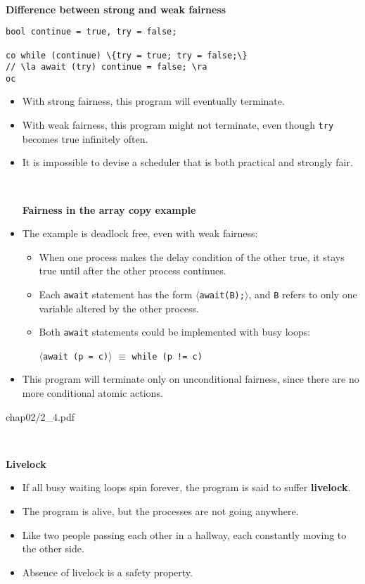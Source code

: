 \documentclass{article}
\newcommand{\myfigsmall}[1]{\begin{overpic}[scale=1.25]{#1}}
\newcommand{\myfigend}{\end{overpic}\newpage}
\newcommand{\bi}{\begin{itemize}}
\newcommand{\ii}{\item}
\newcommand{\ei}{\end{itemize}}
\newcommand{\ti}[1]{
\mbox{~}

\vspace{1.25in}
\centerline{\bf #1}}
\newcommand{\la}{\ensuremath{\langle}}
\newcommand{\ra}{\ensuremath{\rangle}}
\begin{document}
\newpage
\ti{Difference between strong and weak fairness}
\begin{Verbatim}
bool continue = true, try = false;

co while (continue) \{try = true; try = false;\}
// \la await (try) continue = false; \ra
oc
\end{Verbatim}
\bi
\ii With strong fairness, this program will eventually terminate.
\ii With weak fairness, this program might not terminate, even though
{\tt try} becomes true infinitely often.
\ii It is impossible to devise a scheduler that is both practical and
strongly fair.
\newpage

\ti{Fairness in the array copy example}

\ii The example is deadlock free, even with weak fairness:
\bi
\ii When one process makes the delay condition of the other true, it
stays true until after the other process continues.
\ii Each {\tt await} statement has the form {\tt \la await(B);\ra},
and {\tt B} refers to only one variable altered by the other process.
\ii Both {\tt await} statements could be implemented with busy loops:

\centerline{{\tt \la await (p = c)\ra} $\equiv$ {\tt while (p != c)}}

\ei
\ii This program will terminate only on unconditional fairness, since
there are no more conditional atomic actions.
\ei

\myfigsmall{chap02/2_4.pdf}
\myfigend

\ti{Livelock}
\bi
\ii If all busy waiting loops spin forever, the program is said to
suffer {\bf livelock}.
\ii The program is alive, but the processes are not going anywhere.
\ii Like two people passing each other in a hallway, each constantly
moving to the other side.
\ii Absence of livelock is a safety property.
\ei
\end{document}
